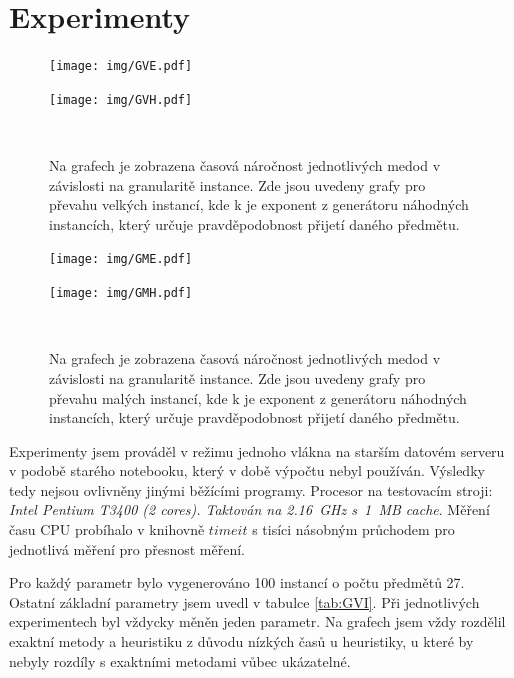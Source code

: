 \documentclass[11pt]{article}
\begin{document}
\section{Experimenty}
 
 
\begin{figure}
	\centering
    \begin{minipage}[c]{0.49\textwidth}
        \centering\texttt{[image: img/GVE.pdf]} 
    \end{minipage}
    \begin{minipage}[c]{0.49\textwidth}
        \centering \texttt{[image: img/GVH.pdf]} 
    \end{minipage}
    \\
   \caption{Na grafech je zobrazena časová náročnost jednotlivých medod v závislosti na granularitě instance. Zde jsou uvedeny grafy pro převahu velkých instancí, kde k je exponent z generátoru náhodných instancích, který určuje pravděpodobnost přijetí daného předmětu.}\label{fig:GVI}
   
    \end{figure} 
    
    \begin{figure}
	\centering
    \begin{minipage}[c]{0.49\textwidth}
        \centering\texttt{[image: img/GME.pdf]} 
    \end{minipage}
    \begin{minipage}[c]{0.49\textwidth}
        \centering \texttt{[image: img/GMH.pdf]} 
    \end{minipage}
    \\
   \caption{Na grafech je zobrazena časová náročnost jednotlivých medod v závislosti na granularitě instance. Zde jsou uvedeny grafy pro převahu malých instancí, kde k je exponent z generátoru náhodných instancích, který určuje pravděpodobnost přijetí daného předmětu.}\label{fig:GMI}
    \end{figure} 
 

 
 
Experimenty jsem prováděl v režimu jednoho vlákna na starším datovém serveru v podobě starého notebooku, který v době výpočtu nebyl používán. Výsledky tedy nejsou ovlivněny jinými běžícími programy. Procesor na testovacím stroji: \textit{Intel Pentium T3400 (2 cores). Taktován na 2.16~GHz s~1~MB cache}.
Měření času CPU probíhalo v knihovně $timeit$ s tisíci násobným průchodem pro jednotlivá měření pro přesnost měření.

Pro každý parametr bylo vygenerováno 100 instancí o počtu předmětů 27. Ostatní základní parametry jsem uvedl v tabulce \ref{tab:GVI}. Při jednotlivých experimentech byl vždycky měněn jeden parametr. Na grafech jsem vždy rozdělil exaktní metody a heuristiku z důvodu nízkých časů u heuristiky, u které by nebyly rozdíly s exaktními metodami vůbec ukázatelné. 
\end{document}
